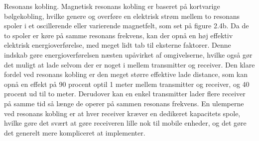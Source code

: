 Resonans kobling. 
Magnetisk resonans kobling er baseret på kortvarige bølgekobling, hvilke genere og overføre en elektrisk strøm mellem to resonans spoler i et oscillerende eller varierende magnetfelt, som set på figure 2.4b. Da de to spoler er køre på samme resonans frekvens, kan der opnå en høj effektiv elektrisk energioverførelse, med meget lidt tab til  eksterne faktorer. Denne indskab gøre energioverførelsen næsten upåvirket af omgivelserne, hvilke også gør det muligt at lade selvom der er noget i mellem transmitter og receiver. 
Den klare fordel ved resonans kobling er den meget større effektive lade distance, som kan opnå en effekt på 90 procent optil 1 meter mellem transmitter og receiver, og 40 procent ud til to meter. Derudover kan en enkel transmitter lader flere receiver på samme tid så længe de operer på sammen resonans frekvens.
En ulemperne ved resonans kobling er at hver receiver kræver en dedikeret kapacitets spole, hvilke gøre det svært at gøre receiveren lille nok til mobile enheder, og det gøre det generelt mere kompliceret at implementer. 